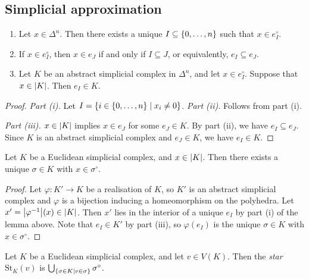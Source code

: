 \subsection{Simplicial approximation}
\begin{lemma}
	\begin{enumerate}
		\item Let \( x \in \Delta^n \).
			Then there exists a unique \( I \subseteq \qty{0, \dots, n} \) such that \( x \in e_I^\circ \).
		\item If \( x \in e_I^\circ \), then \( x \in e_J \) if and only if \( I \subseteq J \), or equivalently, \( e_I \subseteq e_J \).
		\item Let \( K \) be an abstract simplicial complex in \( \Delta^n \), and let \( x \in e_I^\circ \).
			Suppose that \( x \in \abs{K} \).
			Then \( e_I \in K \).
	\end{enumerate}
\end{lemma}
\begin{proof}
	\emph{Part (i).}
	Let \( I = \qty{i \in \qty{0, \dots, n} \mid x_i \neq 0} \).
	\emph{Part (ii).}
	Follows from part (i).

	\emph{Part (iii).}
	\( x \in \abs{K} \) implies \( x \in e_J \) for some \( e_J \in K \).
	By part (ii), we have \( e_I \subseteq e_J \).
	Since \( K \) is an abstract simplicial complex and \( e_J \in K \), we have \( e_I \in K \).
\end{proof}
\begin{corollary}
	Let \( K \) be a Euclidean simplicial complex, and \( x \in \abs{K} \).
	Then there exists a unique \( \sigma \in K \) with \( x \in \sigma^\circ \).
\end{corollary}
\begin{proof}
	Let \( \varphi \colon K' \to K \) be a realisation of \( K \), so \( K' \) is an abstract simplicial complex and \( \varphi \) is a bijection inducing a homeomorphism on the polyhedra.
	Let \( x' = \abs{\varphi^{-1}}(x) \in \abs{K} \).
	Then \( x' \) lies in the interior of a unique \( e_I \) by part (i) of the lemma above.
	Note that \( e_I \in K' \) by part (iii), so \( \varphi(e_I) \) is the unique \( \sigma \in K \) with \( x \in \sigma^\circ \).
\end{proof}
\begin{definition}
	Let \( K \) be a Euclidean simplicial complex, and let \( v \in V(K) \).
	Then the \emph{star} \( \mathrm{St}_K(v) \) is \( \bigcup_{\qty{\sigma \in K \mid v \in \sigma}} \sigma^\circ \).
\end{definition}
